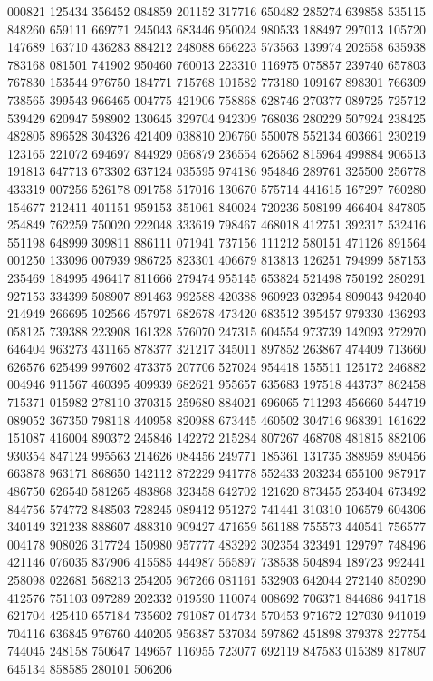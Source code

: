{000821 125434 356452 084859 201152 317716 650482 285274 639858 535115 848260%
659111 669771 245043 683446 950024 980533 188497 297013 105720 147689 163710%
436283 884212 248088 666223 573563 139974 202558 635938 783168 081501 741902%
950460 760013 223310 116975 075857 239740 657803 767830 153544 976750 184771%
715768 101582 773180 109167 898301 766309 738565 399543 966465 004775 421906%
758868 628746 270377 089725 725712 539429 620947 598902 130645 329704 942309%
768036 280229 507924 238425 482805 896528 304326 421409 038810 206760 550078%
552134 603661 230219 123165 221072 694697 844929 056879 236554 626562 815964%
499884 906513 191813 647713 673302 637124 035595 974186 954846 289761 325500%
256778 433319 007256 526178 091758 517016 130670 575714 441615 167297 760280%
154677 212411 401151 959153 351061 840024 720236 508199 466404 847805 254849%
762259 750020 222048 333619 798467 468018 412751 392317 532416 551198 648999%
309811 886111 071941 737156 111212 580151 471126 891564 001250 133096 007939%
986725 823301 406679 813813 126251 794999 587153 235469 184995 496417 811666%
279474 955145 653824 521498 750192 280291 927153 334399 508907 891463 992588%
420388 960923 032954 809043 942040 214949 266695 102566 457971 682678 473420%
683512 395457 979330 436293 058125 739388 223908 161328 576070 247315 604554%
973739 142093 272970 646404 963273 431165 878377 321217 345011 897852 263867%
474409 713660 626576 625499 997602 473375 207706 527024 954418 155511 125172%
246882 004946 911567 460395 409939 682621 955657 635683 197518 443737 862458%
715371 015982 278110 370315 259680 884021 696065 711293 456660 544719 089052%
367350 798118 440958 820988 673445 460502 304716 968391 161622 151087 416004%
890372 245846 142272 215284 807267 468708 481815 882106 930354 847124 995563%
214626 084456 249771 185361 131735 388959 890456 663878 963171 868650 142112%
872229 941778 552433 203234 655100 987917 486750 626540 581265 483868 323458%
642702 121620 873455 253404 673492 844756 574772 848503 728245 089412 951272%
741441 310310 106579 604306 340149 321238 888607 488310 909427 471659 561188%
755573 440541 756577 004178 908026 317724 150980 957777 483292 302354 323491%
129797 748496 421146 076035 837906 415585 444987 565897 738538 504894 189723%
992441 258098 022681 568213 254205 967266 081161 532903 642044 272140 850290%
412576 751103 097289 202332 019590 110074 008692 706371 844686 941718 621704%
425410 657184 735602 791087 014734 570453 971672 127030 941019 704116 636845%
976760 440205 956387 537034 597862 451898 379378 227754 744045 248158 750647%
149657 116955 723077 692119 847583 015389 817807 645134 858585 280101 506206%
}
